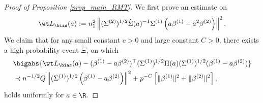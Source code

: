 \documentclass[aos,preprint]{imsart}
\begin{document}
\begin{proof}[Proof of Proposition \ref{prop_main_RMT}]
We first prove an estimate on 
 $$\wt L_{\bias} (a) :=n_1^2 \left\| (\Sigma^{(2)})^{1/2}\hat \Sigma(a)^{-1} \Sigma^{(1)}\left(a\beta^{(1)}- a^2\beta^{(2)}\right) \right\|^2.$$
We claim that for any small constant $c>0$ and large constant $C>0$, there exists a high probability event $\Xi$, on which
\begin{align}
				& \bigabs{ \wt L_{\bias}(a) -   (\beta^{(1)}- a\beta^{(2)} )^\top (\Sigma^{(1)})^{1/2} \Pi(a)(\Sigma^{(1)})^{1/2} (\beta^{(1)}- a\beta^{(2)})   }  \nonumber\\
				& \prec  n^{-1/2}Q  \left\|(\Sigma^{(1)})^{1/2} \left(\beta^{(1)}- a\beta^{(2)}\right) \right\|^2 + p^{-C} \left[\| \beta^{(1)}\|^2 + \| \beta^{(2)}\|^2 \right],  \label{lem_cov_derv_app1}
			\end{align}
holds uniformly for $a\in \R$. 



\end{proof}
\end{document}
